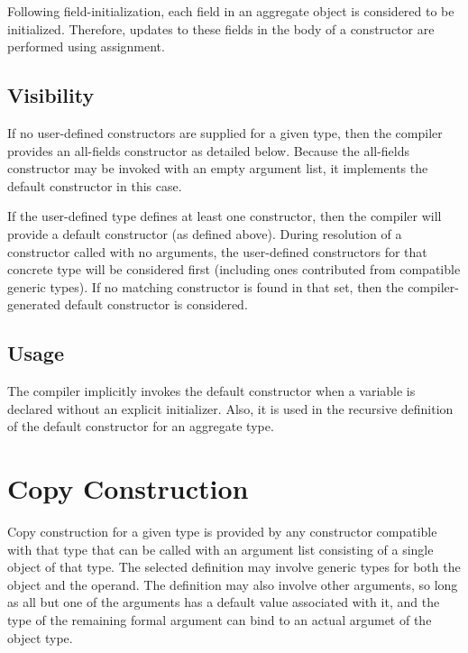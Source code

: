 \begin{note}

Following field-initialization, each field in an aggregate object is considered
to be initialized.  Therefore, updates to these fields in the body of a
constructor are performed using assignment.

\end{note}

\subsection{Visibility}

If no user-defined constructors are supplied for a given type, then the compiler
provides an all-fields constructor as detailed below.  Because the all-fields
constructor may be invoked with an empty argument list, it implements the
default constructor in this case.

If the user-defined type defines at least one constructor, then the compiler
will provide a default constructor (as defined above).  During resolution of a
constructor called with no arguments, the user-defined constructors for that
concrete type will be considered first (including ones contributed from
compatible generic types).  If no matching constructor is found in that set,
then the compiler-generated default constructor is considered.

\subsection{Usage}

The compiler implicitly invokes the default constructor when a variable is
declared without an explicit initializer.  Also, it is used in the recursive
definition of the default constructor for an aggregate type.



\section{Copy Construction}

Copy construction for a given type is provided by any constructor compatible
with that type that can be called with an argument list consisting of a single
object of that type.  The selected definition may involve generic types for both
the object and the operand.  The definition may also involve other arguments, so
long as all but one of the arguments has a default value associated with it, and
the type of the remaining formal argument can bind to an actual argumet of the
object type.

